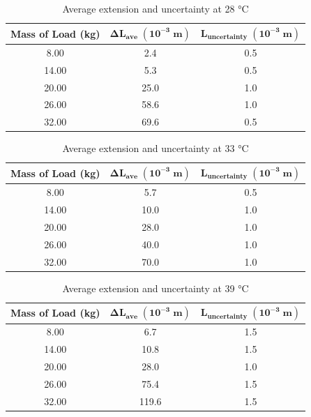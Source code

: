 \documentclass{article}
\begin{document}
\begin{table}[h]
\caption{Average extension and uncertainty at 28 °C}
\centering
\label{tab:my-table}
\begin{tabular}{|c|c|c|}
\hline
\textbf{Mass of Load (kg)} & \textbf{$\boldsymbol{\Delta L_{ave}\; (10^{-3}\;  m)}$} & \textbf{$\boldsymbol{L_{uncertainty}\; (10^{-3}\;  m)}$} \\ \hline
8.00 & 2.4 & 0.5 \\ \hline
14.00 & 5.3 & 0.5 \\ \hline
20.00 & 25.0 & 1.0 \\ \hline
26.00 & 58.6 & 1.0 \\ \hline
32.00 & 69.6 & 0.5 \\ \hline
\end{tabular}
\end{table}

\begin{table}[h]
\caption{Average extension and uncertainty at 33 °C}
\centering
\label{tab:my-table}
\begin{tabular}{|c|c|c|}
\hline
\textbf{Mass of Load (kg)} & \textbf{$\boldsymbol{\Delta L_{ave}\; (10^{-3}\;  m)}$} & \textbf{$\boldsymbol{L_{uncertainty}\; (10^{-3}\;  m)}$} \\ \hline
8.00 & 5.7 & 0.5 \\ \hline
14.00 & 10.0 & 1.0 \\ \hline
20.00 & 28.0 & 1.0 \\ \hline
26.00 & 40.0 & 1.0 \\ \hline
32.00 & 70.0 & 1.0 \\ \hline
\end{tabular}
\end{table}

\begin{table}[h]
\centering
\caption{Average extension and uncertainty at 39 °C}
\label{tab:my-table}
\begin{tabular}{|c|c|c|}
\hline
\textbf{Mass of   Load (kg)} & \textbf{$\boldsymbol{\Delta L_{ave}\; (10^{-3}\;  m)}$} & \textbf{$\boldsymbol{L_{uncertainty}\; (10^{-3}\;  m)}$} \\ \hline
8.00 & 6.7 & 1.5 \\ \hline
14.00 & 10.8 & 1.5 \\ \hline
20.00 & 28.0 & 1.0 \\ \hline
26.00 & 75.4 & 1.5 \\ \hline
32.00 & 119.6 & 1.5 \\ \hline
\end{tabular}
\end{table}
\end{document}
